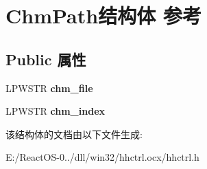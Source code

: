 \hypertarget{struct_chm_path}{}\section{Chm\+Path结构体 参考}
\label{struct_chm_path}
\subsection*{Public 属性}
\begin{DoxyCompactItemize}
\item 
\mbox{\label{struct_chm_path_a8f3cac6e94338d339cd97100d095d1d4}} 
L\+P\+W\+S\+TR {\bfseries chm\+\_\+file}
\item 
\mbox{\label{struct_chm_path_affa30f7fb13282dd1e0f9876d9c45f72}} 
L\+P\+W\+S\+TR {\bfseries chm\+\_\+index}
\end{DoxyCompactItemize}


该结构体的文档由以下文件生成\+:\begin{DoxyCompactItemize}
\item 
E\+:/\+React\+O\+S-\/0../dll/win32/hhctrl.\+ocx/hhctrl.\+h\end{DoxyCompactItemize}
